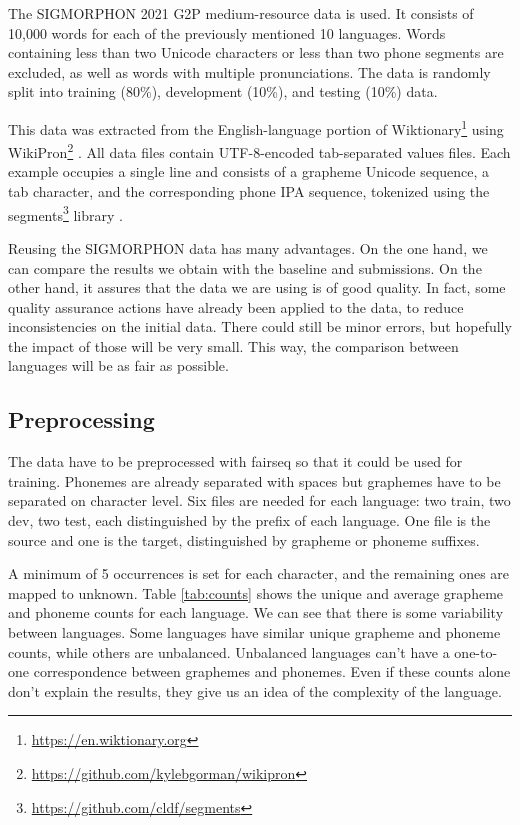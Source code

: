 \documentclass[11pt,a4paper]{article}
\begin{document}
The SIGMORPHON 2021 G2P medium-resource data is used. It consists of 10,000 words for each of the previously mentioned 10 languages. Words containing less than two Unicode characters or less than two phone segments are excluded, as well as words with multiple pronunciations. The data is randomly split into training (80\%), development (10\%), and testing (10\%) data.

This data was extracted from the English-language portion of
Wiktionary\footnote{\url{https://en.wiktionary.org}} using
WikiPron\footnote{\url{https://github.com/kylebgorman/wikipron}} \cite{lee-etal-2020-massively}. All data files contain UTF-8-encoded tab-separated values files. Each example occupies a single line and consists of a grapheme Unicode sequence, a tab character, and the corresponding phone IPA sequence, tokenized using the segments\footnote{\url{https://github.com/cldf/segments}} library \cite{moran2018unicode}.

Reusing the SIGMORPHON data has many advantages. On the one hand, we can compare the results we obtain with the baseline and submissions. On the other hand, it assures that the data we are using is of good quality. In fact, some quality assurance actions have already been applied to the data, to reduce inconsistencies on the initial data. There could still be minor errors, but hopefully the impact of those will be very small. This way, the comparison between languages will be as fair as possible.

\subsection{Preprocessing}

The data have to be preprocessed with fairseq so that it could be used for training. Phonemes are already separated with spaces but graphemes have to be separated on character level. Six files are needed for each language: two train, two dev, two test, each distinguished by the prefix of each language. One file is the source and one is the target, distinguished by grapheme or phoneme suffixes.

A minimum of 5 occurrences is set for each character, and the remaining ones are mapped to unknown. Table \ref{tab:counts} shows the unique and average grapheme and phoneme counts for each language. We can see that there is some variability between languages. Some languages have similar unique grapheme and phoneme counts, while others are unbalanced. Unbalanced languages can't have a one-to-one correspondence between graphemes and phonemes. Even if these counts alone don't explain the results, they give us an idea of the complexity of the language.
\end{document}
